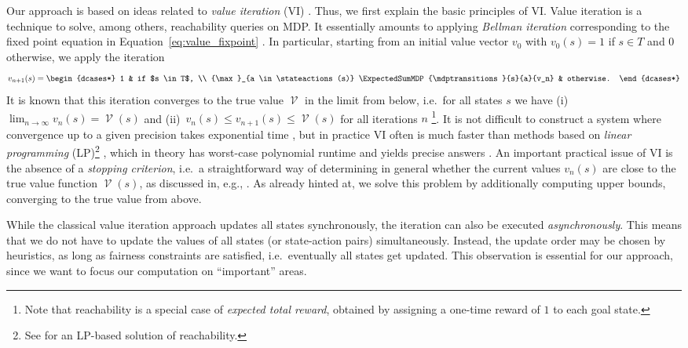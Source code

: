 \documentclass{article}
\DeclareMathOperator{\val}{\mathcal{V}}
\newcommand{\targetset}{T}
\begin{document}
Our approach is based on ideas related to \emph{value iteration} (VI) \cite{howard1960dynamic}.
Thus, we first explain the basic principles of VI.
Value iteration is a technique to solve, among others, reachability queries on MDP.
It essentially amounts to applying \emph{Bellman iteration} \cite{bellman1966dynamic} corresponding to the fixed point equation in Equation~\eqref{eq:value_fixpoint} \cite[Section~4.2]{DBLP:conf/sfm/ForejtKNP11}.
In particular, starting from an initial value vector $v_0$ with $v_0(s) = 1$ if $s \in \targetset$ and $0$ otherwise, we apply the iteration
\begin{equation*}
	v_{n+1}(s) = \begin{dcases*}
		1 & if $s \in \targetset$, \\
		{\max}_{a \in \stateactions(s)} \ExpectedSumMDP{\mdptransitions}{s}{a}{v_n} & otherwise.
	\end{dcases*}
\end{equation*}
It is known that this iteration converges to the true value $\val$ in the limit from below, i.e.\ for all states $s$ we have (i)~$\lim_{n \to \infty} v_n(s) = \val(s)$ and (ii)~$v_n(s) \leq v_{n+1}(s) \leq \val(s)$ for all iterations $n$ \cite[Theorem~7.2.12]{DBLP:books/wi/Puterman94}\footnote{Note that reachability is a special case of \emph{expected total reward}, obtained by assigning a one-time reward of $1$ to each goal state.}.
It is not difficult to construct a system where convergence up to a given precision takes exponential time \cite{DBLP:conf/rp/HaddadM14}, but in practice VI often is much faster than methods based on \emph{linear programming} (LP)\footnote{See \cite[Theorem~10.105]{DBLP:books/daglib/0020348} for an LP-based solution of reachability.} \cite{DBLP:conf/tacas/HartmannsJQW23}, which in theory has worst-case polynomial runtime and yields precise answers \cite{DBLP:journals/combinatorica/Karmarkar84}.
An important practical issue of VI is the absence of a \emph{stopping criterion}, i.e.\ a straightforward way of determining in general whether the current values $v_n(s)$ are close to the true value function $\val(s)$, as discussed in, e.g., \cite[Section~4.2]{DBLP:conf/sfm/ForejtKNP11}.
As already hinted at, we solve this problem by additionally computing upper bounds, converging to the true value from above.

While the classical value iteration approach updates all states synchronously, the iteration can also be executed \emph{asynchronously}.
This means that we do not have to update the values of all states (or state-action pairs) simultaneously.
Instead, the update order may be chosen by heuristics, as long as fairness constraints are satisfied, i.e.\ eventually all states get updated.
This observation is essential for our approach, since we want to focus our computation on \enquote{important} areas.
\end{document}
